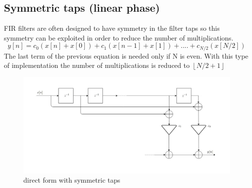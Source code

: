 \subsection{Symmetric taps (linear phase)}
FIR filters are often designed to have symmetry in the filter taps so this symmetry can be exploited in order to reduce the number of multiplications.
$$y[n]= c_{0}(x[n]+x[0])+c_{1}(x[n-1]+x[1])+....+c_{N/2}(x[N/2])$$
The last term of the previous equation is needed only if N is even.
With this type of implementation the number of multiplications is reduced to $\left \lfloor N/2+1 \right \rfloor$
\begin{figure}[H]
    \centering
    \includegraphics[scale=0.45]{images/symmetryc.jpg}    
    \caption{direct form with symmetric taps}
    \label{fig:symmetric}
\end{figure}
